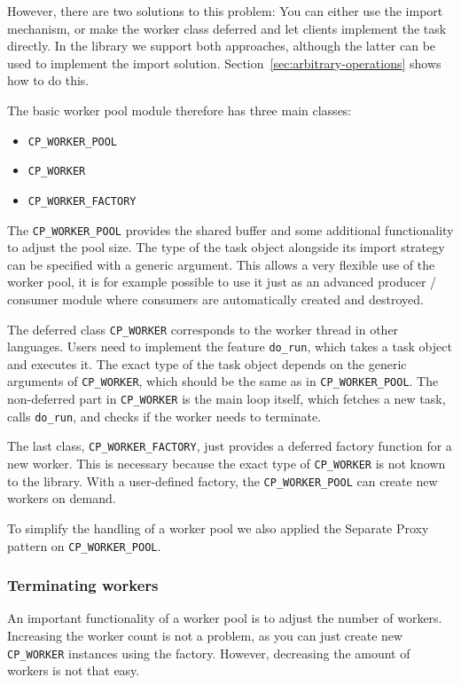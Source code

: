 \documentclass[a4paper,10pt]{report}
\begin{document}
However, there are two solutions to this problem: You can either use the import mechanism, or make the worker class deferred and let clients implement the task directly.
In the library we support both approaches, although the latter can be used to implement the import solution.
Section~\ref{sec:arbitrary-operations} shows how to do this.

The basic worker pool module therefore has three main classes:
\begin{itemize}
 \item \lstinline!CP_WORKER_POOL!
 \item \lstinline!CP_WORKER!
 \item \lstinline!CP_WORKER_FACTORY!
\end{itemize}

The \lstinline!CP_WORKER_POOL! provides the shared buffer and some additional functionality to adjust the pool size.
The type of the task object alongside its import strategy can be specified with a generic argument.
This allows a very flexible use of the worker pool, it is for example possible to use it just as an advanced producer / consumer module where consumers are automatically created and destroyed.

The deferred class \lstinline!CP_WORKER! corresponds to the worker thread in other languages.
Users need to implement the feature \lstinline!do_run!, which takes a task object and executes it.
The exact type of the task object depends on the generic arguments of \lstinline!CP_WORKER!, which should be the same as in \lstinline!CP_WORKER_POOL!.
The non-deferred part in \lstinline!CP_WORKER! is the main loop itself, which fetches a new task, calls \lstinline!do_run!, and checks if the worker needs to terminate.

The last class, \lstinline!CP_WORKER_FACTORY!, just provides a deferred factory function for a new worker.
This is necessary because the exact type of \lstinline!CP_WORKER! is not known to the library.
With a user-defined factory, the \lstinline!CP_WORKER_POOL! can create new workers on demand.

To simplify the handling of a worker pool we also applied the Separate Proxy pattern on \lstinline!CP_WORKER_POOL!.

\subsubsection{Terminating workers}

An important functionality of a worker pool is to adjust the number of workers.
Increasing the worker count is not a problem, as you can just create new \lstinline!CP_WORKER! instances using the factory.
However, decreasing the amount of workers is not that easy.
\end{document}
